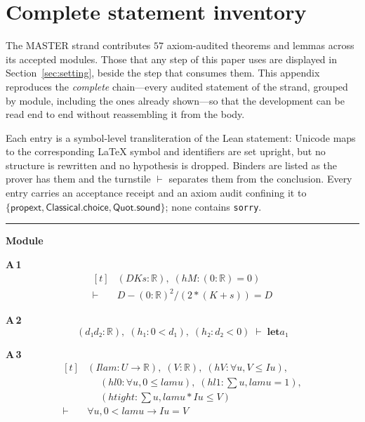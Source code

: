 \appendices
\section{Complete statement inventory}
\label{app:inventory}

The MASTER strand contributes $57$ axiom-audited theorems and lemmas across its accepted modules. Those that any step of this paper uses are displayed in Section~\ref{sec:setting}, beside the step that consumes them. This appendix reproduces the \emph{complete} chain---every audited statement of the strand, grouped by module, including the ones already shown---so that the development can be read end to end without reassembling it from the body.

Each entry is a symbol-level transliteration of the Lean statement: Unicode maps to the corresponding \LaTeX{} symbol and identifiers are set upright, but no structure is rewritten and no hypothesis is dropped. Binders are listed as the prover has them and the turnstile $\vdash$ separates them from the conclusion. Every entry carries an acceptance receipt and an axiom audit confining it to $\{\textsf{propext},\textsf{Classical.choice},\textsf{Quot.sound}\}$; none contains \texttt{sorry}.

\vspace{4pt}\noindent\rule{\columnwidth}{0.4pt}\par\vspace{2pt}
\noindent\textbf{Module }\par\vspace{3pt}

\noindent\textbf{A\,1}\quad{}
{\footnotesize\[ \begin{aligned}[t]
&(\mathit{D} \mathit{K} \mathit{s} : \mathbb{R} ),\; (\mathit{hM} : (0:\mathbb{R} ) = 0)\\
\vdash\;&\mathit{D} - (0:\mathbb{R} )^{2}/(2*(\mathit{K} + \mathit{s})) = \mathit{D}
\end{aligned} \]}

\noindent\textbf{A\,2}\quad{}
{\footnotesize\[ (\mathit{d₁} \mathit{d₂} : \mathbb{R} ),\; (\mathit{h₁} : 0 < \mathit{d₁}),\; (\mathit{h₂} : \mathit{d₂} < 0) \;\vdash\; \mathbf{let} \mathit{a₁} \]}

\noindent\textbf{A\,3}\quad{}
{\footnotesize\[ \begin{aligned}[t]
&(\mathit{I} \mathit{lam} : \mathit{U} \to \mathbb{R} ),\; (\mathit{V} : \mathbb{R} ),\; (\mathit{hV} : \forall \mathit{u}, \mathit{V} \leq \mathit{I} \mathit{u}),\\
&\quad \; (\mathit{hl0} : \forall \mathit{u}, 0 \leq \mathit{lam} \mathit{u}),\; (\mathit{hl1} : \textstyle\sum \mathit{u}, \mathit{lam} \mathit{u} = 1),\\
&\quad \; (\mathit{htight} : \textstyle\sum \mathit{u}, \mathit{lam} \mathit{u} * \mathit{I} \mathit{u} \leq \mathit{V})\\
\vdash\;&\forall \mathit{u}, 0 < \mathit{lam} \mathit{u} \to \mathit{I} \mathit{u} = \mathit{V}
\end{aligned} \]}

